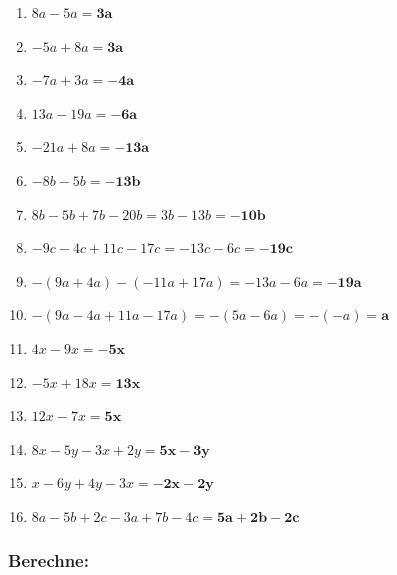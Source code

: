 \documentclass[a4paper,12pt]{article} %
\begin{document}
\begin{enumerate}[label=\alph*)]

  \item \(8a - 5a = \mathbf{3a}\) %

  \item \(-5a + 8a = \mathbf{3a}\) %

  \item \(-7a + 3a = \mathbf{-4a}\) %

  \item \(13a - 19a = \mathbf{-6a}\) %

  \item \(-21a + 8a = \mathbf{-13a}\) %

  \item \(-8b - 5b = \mathbf{-13b}\) %

  \item \(8b - 5b + 7b - 20b = 3b - 13b = \mathbf{-10b}\) %

  \item \(-9c - 4c + 11c - 17c = -13c - 6c = \mathbf{-19c}\) %

  \item \(-(9a + 4a) - (-11a + 17a) = -13a - 6a = \mathbf{-19a}\) %

  \item \(-(9a - 4a + 11a - 17a) = -(5a - 6a) = -(-a) = \mathbf{a}\) %

  \item \(4x - 9x = \mathbf{-5x}\) %

  \item \(-5x + 18x = \mathbf{13x}\) %

  \item \(12x - 7x = \mathbf{5x}\) %

  \item \(8x - 5y - 3x + 2y = \mathbf{5x - 3y}\) %

  \item \(x - 6y + 4y - 3x = \mathbf{-2x - 2y}\) %

  \item \(8a - 5b + 2c - 3a + 7b - 4c = \mathbf{5a + 2b - 2c}\) %

\end{enumerate}

\subsubsection{Berechne:} %
\end{document}
